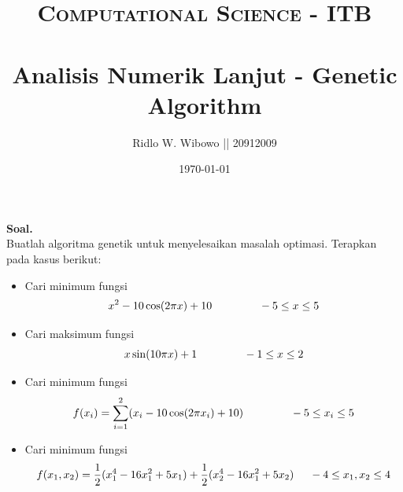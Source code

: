 \documentclass[paper=a4, fontsize=11pt]{scrartcl}
\title{	
\normalfont \normalsize 
\textsc{Computational Science - ITB} \\ [25pt] %
\horrule{0.5pt} \\[0.4cm] %
\large Analisis Numerik Lanjut - Genetic Algorithm\\ %
}
\author{\small{Ridlo W. Wibowo || 20912009}} %
\date{\normalsize\today} %
\numberwithin{equation}{section} %
\numberwithin{figure}{section} %
\numberwithin{table}{section} %
\begin{document}
\maketitle %

\large \textbf{Soal.}\\
Buatlah algoritma genetik untuk menyelesaikan masalah optimasi. Terapkan pada kasus berikut:
\begin{itemize}
\item Cari minimum fungsi
\begin{equation*}
x^{2} - 10 \cos(2 \pi x) + 10 \hspace{1.5cm} -5 \leq x \leq 5
\end{equation*}
\item Cari maksimum fungsi
\begin{equation*}
x \sin(10 \pi x) + 1 \hspace{1.5cm} -1 \leq x \leq 2
\end{equation*}
\item Cari minimum fungsi
\begin{equation*}
f(x_{i}) = \sum_{i=1}^{2}(x_{i} - 10 \cos(2 \pi x_{i}) + 10) \hspace{1.5cm} -5 \leq x_{i} \leq 5
\end{equation*}
\item Cari minimum fungsi
\begin{equation*}
f(x_{1}, x_{2}) = \frac{1}{2}(x_{1}^{4} - 16x_{1}^{2} + 5x_{1}) + \frac{1}{2}(x_{2}^{4} - 16x_{1}^{2} + 5x_{2}) \hspace{0.5cm} -4 \leq x_{1}, x_{2} \leq 4
\end{equation*}
\end{itemize}
\end{document}
